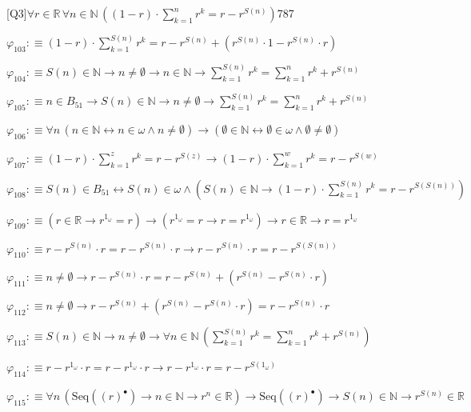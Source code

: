 \begin{fullproof}{[Q3]}{$\forall r \in \mathbb{R}\,\forall n \in \mathbb{N}\,((1 - r) \cdot {\textstyle\sum_{k=1}^{n} {{r}^{k}}} = r - {{r}^{S(n)}})$}{787}
\begin{abbrevlist}
\item $\varphi_{103} :\equiv (1 - r) \cdot {\textstyle\sum_{k=1}^{S(n)} {{r}^{k}}} = r - {{r}^{S(n)}} + ({{r}^{S(n)}} \cdot 1 - {{r}^{S(n)}} \cdot r)$
\item $\varphi_{104} :\equiv S(n) \in \mathbb{N} \to n \neq \emptyset \to n \in \mathbb{N} \to {\textstyle\sum_{k=1}^{S(n)} {{r}^{k}}} = {\textstyle\sum_{k=1}^{n} {{r}^{k}}} + {{r}^{S(n)}}$
\item $\varphi_{105} :\equiv n \in B_{51} \to S(n) \in \mathbb{N} \to n \neq \emptyset \to {\textstyle\sum_{k=1}^{S(n)} {{r}^{k}}} = {\textstyle\sum_{k=1}^{n} {{r}^{k}}} + {{r}^{S(n)}}$
\item $\varphi_{106} :\equiv \forall n\,(n \in \mathbb{N} \leftrightarrow n \in \omega \land n \neq \emptyset) \to (\emptyset \in \mathbb{N} \leftrightarrow \emptyset \in \omega \land \emptyset \neq \emptyset)$
\item $\varphi_{107} :\equiv (1 - r) \cdot {\textstyle\sum_{k=1}^{z} {{r}^{k}}} = r - {{r}^{S(z)}} \to (1 - r) \cdot {\textstyle\sum_{k=1}^{w} {{r}^{k}}} = r - {{r}^{S(w)}}$
\item $\varphi_{108} :\equiv S(n) \in B_{51} \leftrightarrow S(n) \in \omega \land (S(n) \in \mathbb{N} \to (1 - r) \cdot {\textstyle\sum_{k=1}^{S(n)} {{r}^{k}}} = r - {{r}^{S(S(n))}})$
\item $\varphi_{109} :\equiv (r \in \mathbb{R} \to {{r}^{1_{\omega}}} = r) \to ({{r}^{1_{\omega}}} = r \to r = {{r}^{1_{\omega}}}) \to r \in \mathbb{R} \to r = {{r}^{1_{\omega}}}$
\item $\varphi_{110} :\equiv r - {{r}^{S(n)}} \cdot r = r - {{r}^{S(n)}} \cdot r \to r - {{r}^{S(n)}} \cdot r = r - {{r}^{S(S(n))}}$
\item $\varphi_{111} :\equiv n \neq \emptyset \to r - {{r}^{S(n)}} \cdot r = r - {{r}^{S(n)}} + ({{r}^{S(n)}} - {{r}^{S(n)}} \cdot r)$
\item $\varphi_{112} :\equiv n \neq \emptyset \to r - {{r}^{S(n)}} + ({{r}^{S(n)}} - {{r}^{S(n)}} \cdot r) = r - {{r}^{S(n)}} \cdot r$
\item $\varphi_{113} :\equiv S(n) \in \mathbb{N} \to n \neq \emptyset \to \forall n \in \mathbb{N}\,({\textstyle\sum_{k=1}^{S(n)} {{r}^{k}}} = {\textstyle\sum_{k=1}^{n} {{r}^{k}}} + {{r}^{S(n)}})$
\item $\varphi_{114} :\equiv r - {{r}^{1_{\omega}}} \cdot r = r - {{r}^{1_{\omega}}} \cdot r \to r - {{r}^{1_{\omega}}} \cdot r = r - {{r}^{S(1_{\omega})}}$
\item $\varphi_{115} :\equiv \forall n\,(\mathrm{Seq}({(r)^{\bullet}}) \to n \in \mathbb{N} \to {{r}^{n}} \in \mathbb{R}) \to \mathrm{Seq}({(r)^{\bullet}}) \to S(n) \in \mathbb{N} \to {{r}^{S(n)}} \in \mathbb{R}$

\end{abbrevlist}
\end{fullproof}
